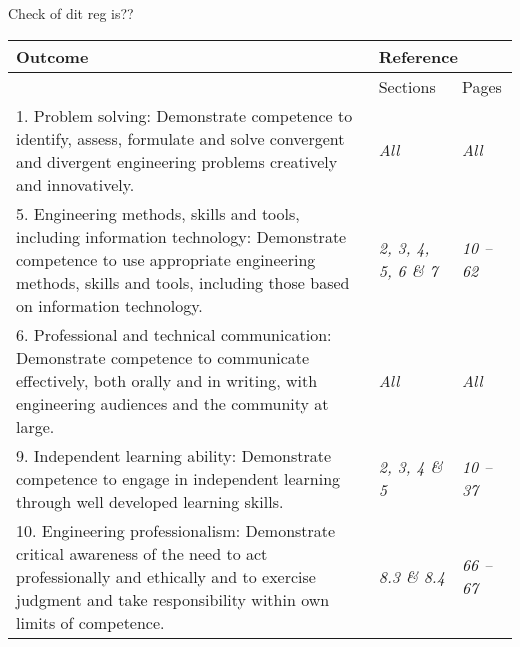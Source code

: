 

Check of dit reg is??
\begin{ecsa}      %


\begin{tabular}{|p{8.3cm}|p{2.7cm}|p{1.5cm}|}
\hline
\textbf{Outcome}&\multicolumn{2}{|l|}{\textbf{Reference}}\\
\hline
& Sections & Pages\\
\hline
1. Problem solving: Demonstrate competence to identify, assess, formulate and solve convergent and divergent engineering problems creatively and innovatively. & \textit{All} & \textit{All}\\
\hline
5. Engineering methods, skills and tools, including information technology: Demonstrate competence to use appropriate engineering methods, skills and tools, including those based on information technology. & \textit{2, 3, 4, 5, 6 \& 7} & \textit{10 -- 62}\\
\hline
6. Professional and technical communication: Demonstrate competence to communicate ef{f}ectively, both orally and in writing, with engineering audiences and the community at large. & \textit{All} & \textit{All}\\
\hline
9. Independent learning ability: Demonstrate competence to engage in independent learning through well developed learning skills. & \textit{2, 3, 4 \& 5} &  \textit{10 -- 37}     \\
\hline
10. Engineering professionalism: Demonstrate critical awareness of the need to act professionally and ethically and to exercise judgment and take responsibility within own limits of competence. &\textit{8.3 \& 8.4}  &  \textit{66 -- 67}        \\
\hline
\end{tabular}





\end{ecsa}


